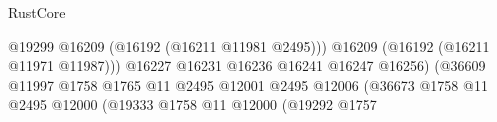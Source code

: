 \begin{lexlean}{RustCore}
\begin{coremodule}
                                                                          @19299
                                                                          @16209
                                                                          (@16192
                                                                            (@16211 @11981 @2495)))
                                                                        @16209
                                                                        (@16192
                                                                          (@16211 @11971 @11987)))
                                                                      @16227
                                                                      @16231
                                                                      @16236
                                                                      @16241
                                                                      @16247
                                                                      @16256)
                                                                    (@36609
                                                                      @11997
                                                                      @1758
                                                                      @1765
                                                                      @11
                                                                      @2495
                                                                      @12001
                                                                      @2495
                                                                      @12006
                                                                      (@36673
                                                                        @1758
                                                                        @11
                                                                        @2495
                                                                        @12000
                                                                        (@19333
                                                                          @1758
                                                                          @11
                                                                          @12000
                                                                          (@19292
                                                                            @1757

\end{coremodule}
\end{lexlean}
